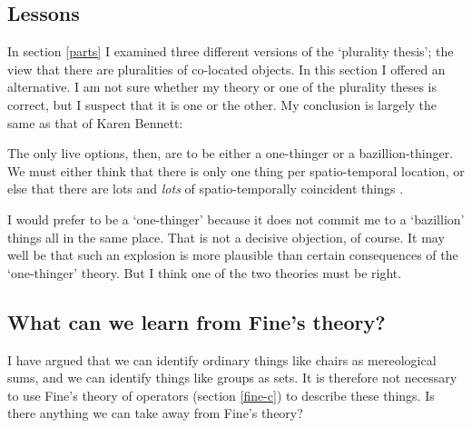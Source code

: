 \documentclass[11pt]{article}
\newenvironment{squote}{%
\begin{spacing}{1}
\begin{list}{}{%
\setlength{\labelwidth}{0pt}%
\rightmargin\leftmargin%
}
\item\relax
}{%
\end{list}%
\end{spacing}
}
\begin{document}
\begin{spacing}{1.5}

\section{Lessons}
\label{lessons-e}
In section \ref{parts} I examined three different versions of the
`plurality thesis'; the view that there are pluralities of co-located
objects.  In this section I offered an alternative.  I am not sure
whether my theory or one of the plurality theses is correct, but I
suspect that it is one or the other.  My conclusion is largely the
same as that of Karen Bennett:

\begin{squote}
The only live options, then, are to be either a one-thinger or a
bazillion-thinger.  We must either think that there is only one thing per
spatio-temporal location, or else that there are lots and \emph{lots} of
spatio-temporally coincident things \citeyearpar[358]{bennett2004}.
\end{squote}

I would prefer to be a `one-thinger' because it does not commit me to
a `bazillion' things all in the same place.  That is not a decisive
objection, of course.  It may well be that such an explosion is more
plausible than certain consequences of the `one-thinger' theory.  But
I think one of the two theories must be right.

\subsection{What can we learn from Fine's theory?}
\label{need-fine}
I have argued that we can identify ordinary things like chairs as
mereological sums, and we can identify things like groups as sets.  It
is therefore not necessary to use Fine's theory of operators (section
\ref{fine-c}) to describe these things.  Is there anything we can take
away from Fine's theory?


\end{spacing}
\end{document}

